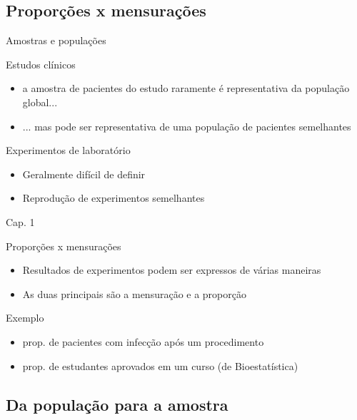 \documentclass{beamer}
\begin{document}
\subsection{Proporções x mensurações}

\begin{frame}{Amostras e populações}
  \begin{block}{Estudos clínicos}
    \begin{itemize}
    \item a amostra de pacientes do estudo raramente é representativa da população global...
    \item ... mas pode ser representativa de uma população de pacientes semelhantes
    \end{itemize}
  \end{block}
  \begin{block}{Experimentos de laboratório}
    \begin{itemize}
    \item Geralmente difícil de definir
    \item Reprodução de experimentos semelhantes
    \end{itemize}
  \end{block}
\hfill Cap. 1
\end{frame}

\begin{frame}{Proporções x mensurações}
  \begin{itemize}
  \item Resultados de experimentos podem ser expressos de várias maneiras
  \item As duas principais são a mensuração e a proporção
  \end{itemize}
  \begin{exampleblock}{Exemplo}
    \begin{itemize}
    \item prop. de pacientes com infecção após um procedimento
    \item prop. de estudantes aprovados em um curso (de Bioestatística)
    \end{itemize}
  \end{exampleblock}
\end{frame}

\subsection{Da população para a amostra}
\end{document}
